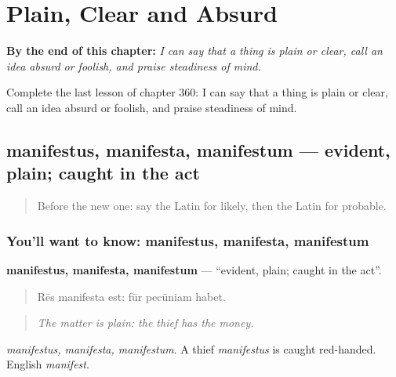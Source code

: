 
\chapter{Plain, Clear and Absurd}
\label{ch:la-plain-clear-and-absurd}

\begin{chapteropening}
\textbf{By the end of this chapter:} \emph{I can say that a thing is plain or clear, call an idea absurd or foolish, and praise steadiness of mind.}

Complete the last lesson of chapter 360: I can say that a thing is plain or clear, call an idea absurd or foolish, and praise steadiness of mind.
\end{chapteropening}

\section[manifestus, manifesta, manifestum]{manifestus, manifesta, manifestum — evident, plain; caught in the act}

\label{lesson:LA-C360-manifestus}



\begin{quote}
Before the new one: say the Latin for likely, then the Latin for probable.
\end{quote}

\subsection*{You'll want to know: manifestus, manifesta, manifestum}
\textbf{manifestus, manifesta, manifestum} — \textquotedblleft{}evident, plain; caught in the act\textquotedblright{}.

\begin{quote}
Rēs manifesta est: fūr pecūniam habet.
\end{quote}

\begin{quote}
\emph{The matter is plain: the thief has the money.}
\end{quote}

\emph{manifestus, manifesta, manifestum}. A thief \emph{manifestus} is caught red-handed. English \emph{manifest}.

